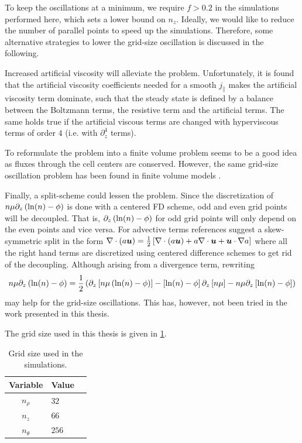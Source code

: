 To keep the oscillations at a minimum, we require $f > 0.2$ in the simulations performed here, which sets a lower bound on $n_z$.
Ideally, we would like to reduce the number of parallel points to speed up the simulations.
Therefore, some alternative strategies to lower the grid-size oscillation is discussed in the following.

Increased artificial viscosity will alleviate the problem.
Unfortunately, it is found that the artificial viscosity coefficients needed for a smooth $j_\|$ makes the artificial viscosity term dominate, such that the steady state is defined by a balance between the Boltzmann terms, the resistive term and the artificial terms.
The same holds true if the artificial viscous terms are changed with hyperviscous terms of order $4$ (i.e. with $\partial_z^4$ terms).

To reformulate the problem into a finite volume problem seems to be a good idea as fluxes through the cell centers are conserved.
However, the same grid-size oscillation problem has been found in finite volume models \cite{Dudson2017Private}.

Finally, a split-scheme could lessen the problem.
Since the discretization of $n\mu\partial_z\left(\ln(n)-\phi\right)$ is done with a centered FD scheme, odd and even grid points will be decoupled.
That is, $\partial_z\left(\ln(n)-\phi\right)$ for odd grid points will only depend on the even points and vice versa.
For advective terms references \cite{Honein2004,Pirozzoli2011} suggest a skew-symmetric split in the form $\nabla\cdot\left(a\boldsymbol{u}\right) = \frac{1}{2}\left[\nabla\cdot\left(a\boldsymbol{u}\right) + a\nabla\cdot\boldsymbol{u} + \boldsymbol{u}\cdot\nabla a\right]$ where all the right hand terms are discretized using centered difference schemes to get rid of the decoupling.
Although arising from a divergence term, rewriting
%
\begin{align*}
    n\mu\partial_z\left(\ln(n)-\phi\right) =
    \frac{1}{2}\left(
    \partial_z\left[n\mu\left(\ln(n)-\phi\right)\right]-\left[\ln(n)-\phi\right]\partial_z\left[n\mu\right]
    - n\mu\partial_z\left[\ln(n)-\phi\right]
    \right)
\end{align*}
%
may help for the grid-size oscillations.
This has, however, not been tried in the work presented in this thesis.

The grid size used in this thesis is given in \cref{tb:grid}.
%
\begin{table}[!htb]
      \centering
        \begin{tabular}{c|ll}
        \hline\hline
        Variable & Value \\
        \hline
        $n_\rho$   & $32$  \\
        $n_z$      & $66$  \\
        $n_\theta$ & $256$ \\
        \hline\hline
        \end{tabular}
        \caption{Grid size used in the simulations.}
        \label{tb:grid}
\end{table}

